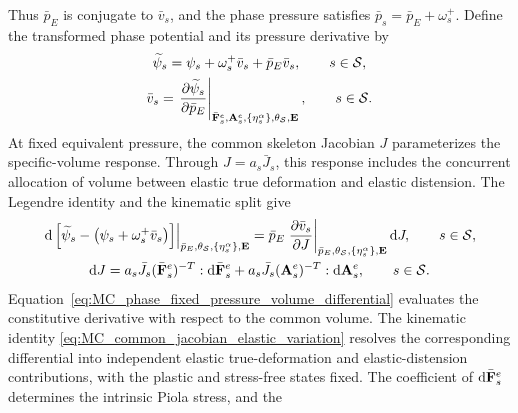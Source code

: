 %
Thus \(\bar p_E\) is conjugate to \(\bar v_s\), and the phase pressure satisfies
\(\bar p_s=\bar p_E+\omega_s^+\).  Define the transformed phase potential and
its pressure derivative by
%
\begin{subequations}
	\label{eq:MC_phase_legendre_transform}
	\begin{gather}
		\widetilde\psi_s
		=
		\psi_s
		+\omega_s^+\bar v_s
		+\bar p_E\bar v_s,
		\qquad
		s\in\mathcal{S},
		\label{eq:MC_phase_legendre_transform_definition} \\
		\bar v_s
		=
		\left.
		\frac{\partial \widetilde\psi_s}{\partial \bar p_E}
		\right\vert_{\bar{\mathbf{F}}_s^e,\mathbf{A}_s^e,
			\{\eta_s^\alpha\},\theta_{\mathcal{S}},\mathbf{E}},
		\qquad
		s\in\mathcal{S} .
		\label{eq:MC_phase_legendre_transform_pressure_derivative}
	\end{gather}
\end{subequations}
%
At fixed equivalent pressure, the common skeleton Jacobian \(J\) parameterizes
the specific-volume response.  Through \(J=a_s\bar J_s\), this response includes
the concurrent allocation of volume between elastic true deformation and
elastic distension.  The Legendre identity and the kinematic split give
%
\begin{subequations}
	\label{eq:MC_phase_specific_volume_deformation_chain_rule}
	\begin{gather}
		\left.
		\mathrm d
		\left[
		\widetilde\psi_s
		-
		\left(
		\psi_s+\omega_s^+\bar v_s
		\right)
		\right]
		\right\vert_{\bar p_E,\theta_{\mathcal{S}},
			\{\eta_s^\alpha\},\mathbf{E}}
		=
		\bar p_E
		\left.
		\frac{\partial \bar v_s}{\partial J}
		\right\vert_{\bar p_E,\theta_{\mathcal{S}},
			\{\eta_s^\alpha\},\mathbf{E}}
		\mathrm dJ,
		\qquad
		s\in\mathcal{S},
		\label{eq:MC_phase_fixed_pressure_volume_differential} \\
		\mathrm dJ
		=
		a_s\bar J_s
		(\bar{\mathbf{F}}_s^e)^{-T}
		:
		\mathrm d\bar{\mathbf{F}}_s^e
		+
		a_s\bar J_s
		(\mathbf{A}_s^e)^{-T}
		:
		\mathrm d\mathbf{A}_s^e,
		\qquad
		s\in\mathcal{S} .
		\label{eq:MC_common_jacobian_elastic_variation}
	\end{gather}
\end{subequations}
%
Equation~\eqref{eq:MC_phase_fixed_pressure_volume_differential} evaluates the
constitutive derivative with respect to the common volume.  The kinematic
identity \eqref{eq:MC_common_jacobian_elastic_variation} resolves the
corresponding differential into independent elastic true-deformation and elastic-distension
contributions, with the plastic and stress-free states fixed.  The coefficient
of \(\mathrm d\bar{\mathbf{F}}_s^e\) determines the intrinsic Piola stress, and the
